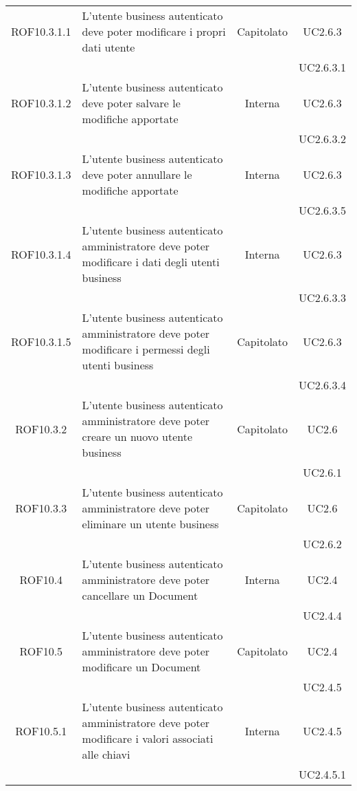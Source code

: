 \begin{longtable}{|c|p{6cm}|c|c|}
\midrule
ROF10.3.1.1
& L'utente business autenticato deve poter modificare i propri dati utente
& Capitolato
& UC2.6.3\\
& & & UC2.6.3.1
\\

\midrule
ROF10.3.1.2
& L'utente business autenticato deve poter  salvare le modifiche apportate
& Interna
& UC2.6.3\\
& & & UC2.6.3.2
\\

\midrule
ROF10.3.1.3
& L'utente business autenticato deve poter annullare le modifiche apportate
& Interna
& UC2.6.3\\
& & & UC2.6.3.5
\\

\midrule
ROF10.3.1.4
& L'utente business autenticato amministratore deve poter modificare i dati degli utenti business
& Interna
& UC2.6.3\\
& & & UC2.6.3.3
\\

\midrule
ROF10.3.1.5
& L'utente business autenticato amministratore deve poter modificare i permessi degli utenti business
& Capitolato
& UC2.6.3\\
& & & UC2.6.3.4
\\

\midrule
ROF10.3.2
& L'utente business autenticato amministratore deve poter creare un nuovo utente business
& Capitolato
& UC2.6\\
& & & UC2.6.1
\\

\midrule
ROF10.3.3
& L'utente business autenticato amministratore deve poter eliminare un utente business
& Capitolato
& UC2.6\\
& & & UC2.6.2
\\

\midrule
ROF10.4
& L'utente business autenticato amministratore deve poter cancellare un Document
& Interna
& UC2.4\\
& & & UC2.4.4
\\

\midrule
ROF10.5
& L'utente business autenticato amministratore deve poter modificare un Document
& Capitolato
& UC2.4\\
& & & UC2.4.5
\\

\midrule
ROF10.5.1
& L'utente business autenticato amministratore deve poter modificare i valori associati alle chiavi
& Interna
& UC2.4.5\\
& & & UC2.4.5.1
\\


\end{longtable}
